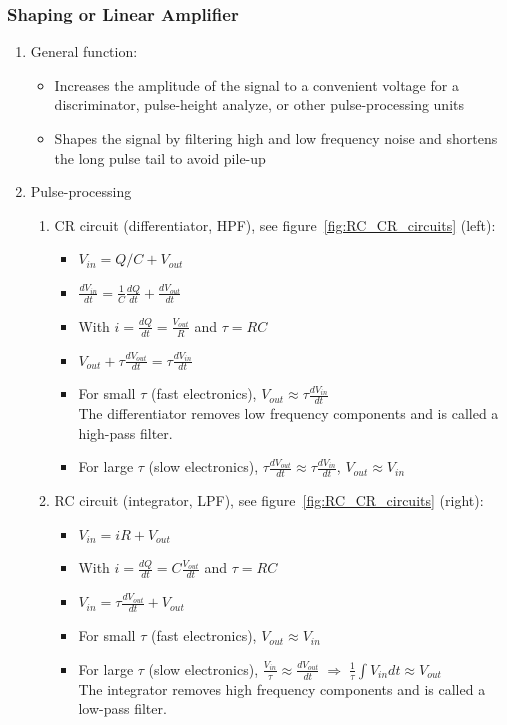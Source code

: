 \subsubsection{Shaping or Linear Amplifier}
\begin{enumerate}
    \item General function:
    \begin{itemize}
        \item Increases the amplitude of the signal to a convenient voltage for a discriminator, pulse-height analyze, or other pulse-processing units
        \item Shapes the signal by filtering high and low frequency noise and shortens the long pulse tail to avoid pile-up
    \end{itemize}
    \item Pulse-processing
    \begin{enumerate}
        \item CR circuit (differentiator, HPF), see figure~\ref{fig:RC_CR_circuits} (left):
        \begin{itemize}
            \item[] $V_{in}=Q/C+V_{out}$
            \item[] $\frac{dV_{in}}{dt}=\frac{1}{C}\frac{dQ}{dt}+\frac{dV_{out}}{dt}$
            \item[] With $i=\frac{dQ}{dt}=\frac{V_{out}}{R}$ and $\tau=RC$
            \item[] $V_{out}+\tau\frac{dV_{out}}{dt}=\tau\frac{dV_{in}}{dt}$
            \item For small $\tau$ (fast electronics), $V_{out}\approx\tau\frac{dV_{in}}{dt}$\\
            The differentiator removes low frequency components and is called a high-pass filter.
            \item For large $\tau$ (slow electronics), $\tau\frac{dV_{out}}{dt}\approx\tau\frac{dV_{in}}{dt}$, $V_{out}\approx V_{in}$
        \end{itemize}
        \item RC circuit (integrator, LPF), see figure~\ref{fig:RC_CR_circuits} (right):
        \begin{itemize}
            \item[] $V_{in}=iR+V_{out}$
            \item[] With $i=\frac{dQ}{dt}=C\frac{V_{out}}{dt}$ and $\tau=RC$
            \item[] $V_{in}=\tau\frac{dV_{out}}{dt}+V_{out}$
            \item For small $\tau$ (fast electronics), $V_{out}\approx V_{in}$
            \item For large $\tau$ (slow electronics), $\frac{V_{in}}{\tau}\approx \frac{dV_{out}}{dt}\;\Rightarrow\;\frac{1}{\tau}\int V_{in}dt\approx V_{out}$\\
            The integrator removes high frequency components and is called a low-pass filter.
        \end{itemize}
    \end{enumerate} 
\end{enumerate}
